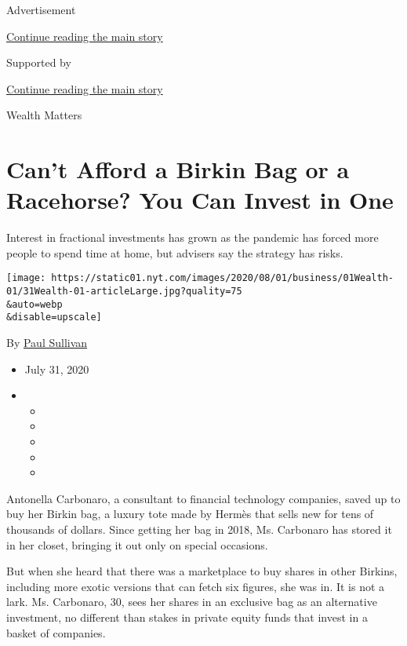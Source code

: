 Advertisement

\protect\hyperlink{after-top}{Continue reading the main story}

Supported by

\protect\hyperlink{after-sponsor}{Continue reading the main story}

Wealth Matters

\hypertarget{cant-afford-a-birkin-bag-or-a-racehorse-you-can-invest-in-one}{%
\section{Can't Afford a Birkin Bag or a Racehorse? You Can Invest in
One}\label{cant-afford-a-birkin-bag-or-a-racehorse-you-can-invest-in-one}}

Interest in fractional investments has grown as the pandemic has forced
more people to spend time at home, but advisers say the strategy has
risks.

\texttt{[image: https://static01.nyt.com/images/2020/08/01/business/01Wealth-01/31Wealth-01-articleLarge.jpg?quality=75\\\&auto=webp\\\&disable=upscale]}

By \href{https://www.nytimes.com/by/paul-sullivan}{Paul Sullivan}

\begin{itemize}
\item
  July 31, 2020
\item
  \begin{itemize}
  \item
  \item
  \item
  \item
  \item
  \end{itemize}
\end{itemize}

Antonella Carbonaro, a consultant to financial technology companies,
saved up to buy her Birkin bag, a luxury tote made by Hermès that sells
new for tens of thousands of dollars. Since getting her bag in 2018, Ms.
Carbonaro has stored it in her closet, bringing it out only on special
occasions.

But when she heard that there was a marketplace to buy shares in other
Birkins, including more exotic versions that can fetch six figures, she
was in. It is not a lark. Ms. Carbonaro, 30, sees her shares in an
exclusive bag as an alternative investment, no different than stakes in
private equity funds that invest in a basket of companies.


